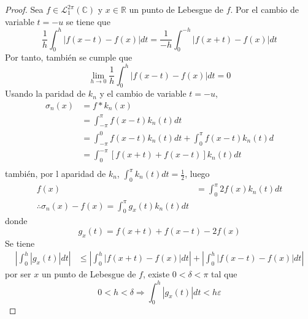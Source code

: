 \documentclass[12pt]{report}
\theoremstyle{largebreak}
\newcommand\abs[1]{\ensuremath{\left|#1\right|}}
\begin{document}
    \begin{proof}
        Sea $f\in\mathcal{L}_1^{2\pi}(\mathbb{C})$ y $x\in\mathbb{R}$ un punto de Lebesgue de $f$. Por el cambio de variable $t=-u$ se tiene que
        \begin{equation*}
            \frac{1}{h}\int_0^h\abs{f(x-t)-f(x)}dt=\frac{1}{-h}\int_0^{-h}\abs{f(x+t)-f(x)}dt
        \end{equation*}
        Por tanto, también se cumple que
        \begin{equation*}
            \lim_{ h\rightarrow0}\frac{1}{h}\int_0^h\abs{f(x-t)-f(x)}dt=0
        \end{equation*}
        Usando la paridad de $k_n$ y el cambio de variable $t=-u$,
        \begin{equation*}
            \begin{split}
                \sigma_n(x)&=f*k_n(x)\\
                &=\int_{-\pi}^{\pi}f(x-t)k_n(t)dt\\
                &=\int_{-\pi}^{0}f(x-t)k_n(t)dt+\int_{0}^{\pi}f(x-t)k_n(t)d\\
                &=\int_{0}^{-\pi}\left[f(x+t)+f(x-t)\right]k_n(t)dt\\
            \end{split}
        \end{equation*}
        también, por l aparidad de $k_n$, $\int_{0}^{\pi}k_n(t)dt=\frac{1}{2}$, luego
        \begin{equation*}
            \begin{split}
                f(x)&=\int_0^{\pi}2f(x)k_n(t)dt\\
                \therefore \sigma_n(x)-f(x)=\int_0^{\pi}g_x(t)k_n(t)dt
            \end{split}
        \end{equation*}
        donde
        \begin{equation*}
            g_x(t)=f(x+t)+f(x-t)-2f(x)
        \end{equation*}
        Se tiene
        \begin{equation*}
            \begin{split}
                \abs{\int_0^{h}\abs{g_x(t)}dt}&\leq\abs{\int_0^h\abs{f(x+t)-f(x)}dt}+\abs{\int_0^h\abs{f(x-t)-f(x)}dt}
            \end{split}
        \end{equation*}
        por ser $x$ un punto de Lebesgue de $f$, existe $0<\delta<\pi$ tal que
        \begin{equation*}
            0<h<\delta\Rightarrow\int_0^{h}\abs{g_x(t)}dt<h\varepsilon
        \end{equation*}
    \end{proof}
\end{document}

